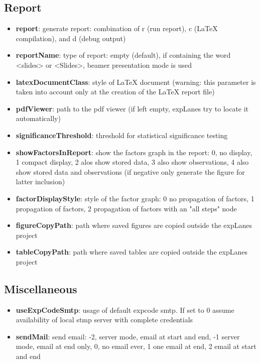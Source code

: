 \documentclass[a4paper,fleqn]{tufte-handout}
\begin{document}
\subsection{Report}

\begin{itemize}
\item \textbf{report}: generate report: combination of r (run report), c (LaTeX compilation), and d (debug output)
\item \textbf{reportName}: type of report: empty (default), if containing the word <slides> or <Slides>,  beamer presentation mode is used
\item \textbf{latexDocumentClass}: style of LaTeX document (warning: this parameter is taken into account only at the creation of the LaTeX report file)
\item \textbf{pdfViewer}: path to the pdf viewer (if left empty, expLanes try to locate it automatically)
\item \textbf{significanceThreshold}: threshold for statistical significance testing
\item \textbf{showFactorsInReport}: show the factors graph in the report: 0, no display, 1 compact display, 2 alos show stored data, 3 also show observations, 4 also show stored data and observations (if negative only generate the figure for latter inclusion)
\item \textbf{factorDisplayStyle}:  style of the factor graph: 0 no propagation of factors, 1 propagation of factors, 2 propagation of factors with an "all steps" node
\item \textbf{figureCopyPath}: path where saved figures are copied outside the expLanes project
\item \textbf{tableCopyPath}: path where saved tables are copied outside the expLanes project
\end{itemize}

\subsection{Miscellaneous}

\begin{itemize}
\item \textbf{useExpCodeSmtp}: usage of default expcode smtp. If set to 0 assume availability of local stmp server with complete credentials
\item \textbf{sendMail}: send email: -2, server mode, email at start and end, -1 server mode, email at end only, 0, no email ever, 1 one email at end, 2 email at start and end
\end{itemize}
\end{document}
